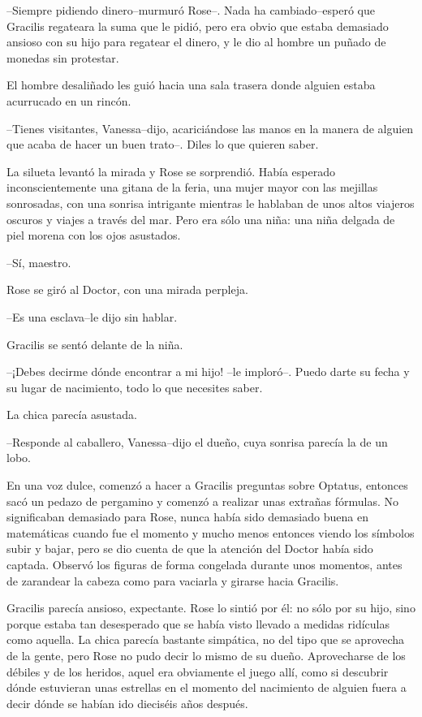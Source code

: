 --Siempre pidiendo dinero--murmuró Rose--. Nada ha cambiado--esperó que
Gracilis regateara la suma que le pidió, pero era obvio que estaba
demasiado ansioso con su hijo para regatear el dinero, y le dio al
hombre un puñado de monedas sin protestar.

El hombre desaliñado les guió hacia una sala trasera donde alguien
estaba acurrucado en un rincón.

--Tienes visitantes, Vanessa--dijo, acariciándose las manos en la manera
de alguien que acaba de hacer un buen trato--. Diles lo que quieren
saber.

La silueta levantó la mirada y Rose se sorprendió. Había esperado
inconscientemente una gitana de la feria, una mujer mayor con las
mejillas sonrosadas, con una sonrisa intrigante mientras le hablaban de
unos altos viajeros oscuros y viajes a través del mar. Pero era sólo una
niña: una niña delgada de piel morena con los ojos asustados.

--Sí, maestro.

Rose se giró al Doctor, con una mirada perpleja.

--Es una esclava--le dijo sin hablar.

Gracilis se sentó delante de la niña.

--¡Debes decirme dónde encontrar a mi hijo! --le imploró--. Puedo darte
su fecha y su lugar de nacimiento, todo lo que necesites saber.

La chica parecía asustada.

--Responde al caballero, Vanessa--dijo el dueño, cuya sonrisa parecía la
de un lobo.

En una voz dulce, comenzó a hacer a Gracilis preguntas sobre Optatus,
entonces sacó un pedazo de pergamino y comenzó a realizar unas extrañas
fórmulas. No significaban demasiado para Rose, nunca había sido
demasiado buena en matemáticas cuando fue el momento y mucho menos
entonces viendo los símbolos subir y bajar, pero se dio cuenta de que la
atención del Doctor había sido captada. Observó los figuras de forma
congelada durante unos momentos, antes de zarandear la cabeza como para
vaciarla y girarse hacia Gracilis.

Gracilis parecía ansioso, expectante. Rose lo sintió por él: no sólo por
su hijo, sino porque estaba tan desesperado que se había visto llevado a
medidas ridículas como aquella. La chica parecía bastante simpática, no
del tipo que se aprovecha de la gente, pero Rose no pudo decir lo mismo
de su dueño. Aprovecharse de los débiles y de los heridos, aquel era
obviamente el juego allí, como si descubrir dónde estuvieran unas
estrellas en el momento del nacimiento de alguien fuera a decir dónde se
habían ido dieciséis años después.

